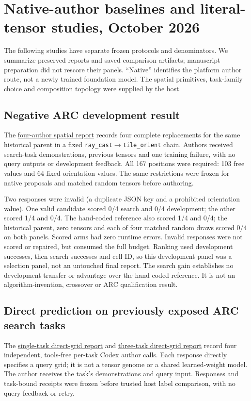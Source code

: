 \documentclass[11pt]{article}
\begin{document}
\section{Native-author baselines and literal-tensor studies, October 2026}\label{sec:native20261006}
The following studies have separate frozen protocols and denominators. We summarize preserved
reports and saved comparison artifacts; manuscript preparation did not rescore their panels.
``Native'' identifies the platform author route, not a newly trained foundation model. The
spatial primitives, task-family choice and composition topology were supplied by the host.

\subsection{Negative ARC development result}
The \href{https://github.com/Sanokei/CellForge/blob/02beaf18251fca5ed1f1eb55e92f00a3e3820e88/reports/NATIVE_STORM01_RESULT_20261006.md}{four-author spatial report}
records four complete replacements for the same historical parent in a fixed
\texttt{ray\_cast}$\to$\texttt{tile\_orient} chain. Authors received search-task demonstrations,
previous tensors and one training failure, with no query outputs or development feedback.
All 167 positions were required: 103 free values and 64 fixed orientation values. The same
restrictions were frozen for native proposals and matched random tensors before authoring.

Two responses were invalid (a duplicate JSON key and a prohibited orientation value). One valid
candidate scored 0/4 search and 0/4 development; the other scored 1/4 and 0/4. The hand-coded
reference also scored 1/4 and 0/4; the historical parent, zero tensors and each of four matched
random draws scored 0/4 on both panels. Scored arms had zero runtime errors. Invalid responses
were not scored or repaired, but consumed the full budget. Ranking used development successes,
then search successes and cell ID, so this development panel was a selection panel, not an
untouched final report. The search gain establishes no development transfer or advantage over
the hand-coded reference. It is not an algorithm-invention, crossover or ARC qualification result.

\subsection{Direct prediction on previously exposed ARC search tasks}\label{sec:directarc}
The \href{https://github.com/Sanokei/CellForge/blob/02beaf18251fca5ed1f1eb55e92f00a3e3820e88/reports/NATIVE_DIRECT_GRID_RESULT_20261006.md}{single-task direct-grid report}
and \href{https://github.com/Sanokei/CellForge/blob/02beaf18251fca5ed1f1eb55e92f00a3e3820e88/reports/NATIVE_DIRECT_BATCH02_RESULT_20261006.md}{three-task direct-grid report}
record four independent, tools-free per-task Codex author calls. Each response directly
specifies a query grid; it is not a tensor genome or a shared learned-weight model. The
author receives the task's demonstrations and query input. Responses and task-bound receipts
were frozen before trusted host label comparison, with no query feedback or retry.
\end{document}
